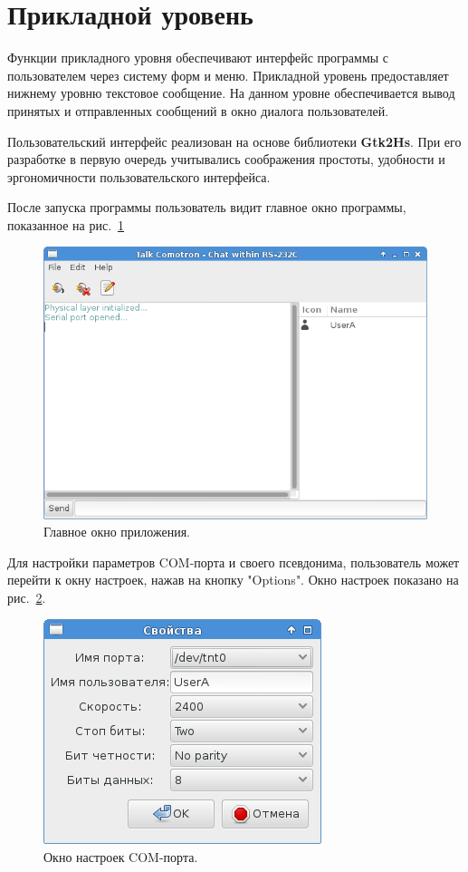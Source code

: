 \documentclass[russian,utf8,simple,emptystyle]{eskdtext}
\begin{document}
\section{Прикладной уровень}
Функции прикладного уровня обеспечивают интерфейс программы с пользователем через систему форм и меню. Прикладной уровень предоставляет нижнему уровню текстовое сообщение. На данном уровне обеспечивается вывод принятых и отправленных сообщений в окно диалога пользователей.

Пользовательский интерфейс реализован на основе библиотеки \textbf{Gtk2Hs}. При его разработке в первую очередь учитывались соображения простоты, удобности и эргономичности пользовательского интерфейса.

После запуска программы пользователь видит главное окно программы, показанное на рис.~\ref{fig:main-window}

\begin{figure}[!h]
\centering
\includegraphics[scale=0.7]{main_window}
\caption{Главное окно приложения.}
\label{fig:main-window}
\end{figure}

Для настройки параметров COM-порта и своего псевдонима, пользователь может перейти к окну настроек, нажав на кнопку "Options". Окно настроек показано на рис.~\ref{fig:options-window}.

\begin{figure}[!h]
\centering
\includegraphics[scale=0.7]{options_window}
\caption{Окно настроек COM-порта.}
\label{fig:options-window}
\end{figure}
\end{document}

